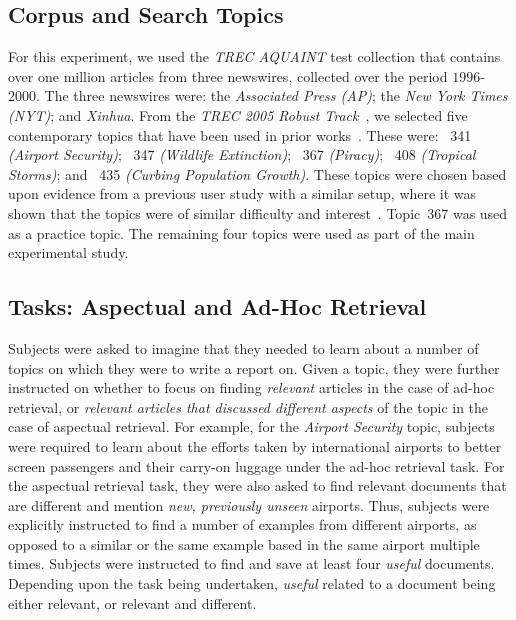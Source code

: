 \subsection{Corpus and Search Topics}\label{sec:method:corpus}
For this experiment, we used the \emph{TREC AQUAINT} test collection that contains over one million articles from three newswires, collected over the period $1996$-$2000$. The three newswires were: the \emph{Associated Press (AP)}; the \emph{New York Times (NYT)}; and \emph{Xinhua}.  From the \emph{TREC 2005 Robust Track}~\cite{voorhees2006trec_robust}, we selected five contemporary topics that have been used in prior works~\cite{azzopardi2013query_cost,kelly2009query_suggestion,maxwell2017snippet_length}. These were: ~341 \emph{(Airport Security)}; ~347 \emph{(Wildlife Extinction)}; ~367 \emph{(Piracy)}; ~408 \emph{(Tropical Storms)}; and ~435 \emph{(Curbing Population Growth)}. These topics were chosen based upon evidence from a previous user study with a similar setup, where it was shown that the topics were of similar difficulty and interest~\cite{kelly2009query_suggestion}. Topic~367 was used as a practice topic. The remaining four topics were used as part of the main experimental study.

\subsection{Tasks: Aspectual and Ad-Hoc Retrieval}
Subjects were asked to imagine that they needed to learn about a number of topics on which they were to write a report on. Given a topic, they were further instructed on whether to focus on finding \emph{relevant} articles in the case of ad-hoc retrieval, or \emph{relevant articles that discussed different aspects} of the topic in the case of aspectual retrieval. For example, for the \emph{Airport Security} topic, subjects were required to learn about the efforts taken by international airports to better screen passengers and their carry-on luggage under the ad-hoc retrieval task. For the aspectual retrieval task, they were also asked to find relevant documents that are different and mention \emph{new, previously unseen} airports. Thus, subjects were explicitly instructed to find a number of examples from different airports, as opposed to a similar or the same example based in the same airport multiple times. Subjects were instructed to find and save at least four \emph{useful} documents. Depending upon the task being undertaken, \emph{useful} related to a document being either relevant, or relevant and different.


